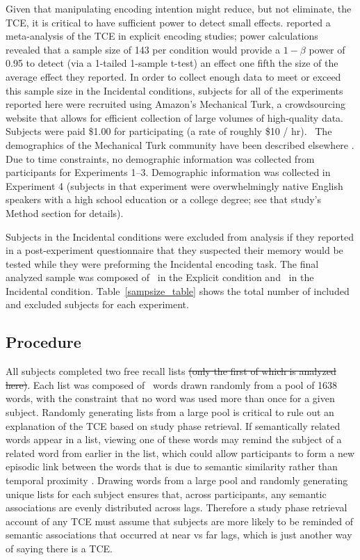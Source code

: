 \documentclass[man,natbib,floatsintext]{apa6} %
\begin{document}
Given that manipulating encoding intention might reduce, but not eliminate, the TCE, it is critical to have sufficient power to detect small effects. \citet{SedeEtal10} reported a meta-analysis of the TCE in explicit encoding studies; power calculations revealed that a sample size of 143 per condition would provide a $1-\beta$ power of 0.95 to detect (via a 1-tailed 1-sample t-test) an effect one fifth the size of the average effect they reported.
In order to collect enough data to meet or exceed this sample size in the Incidental conditions, subjects for all of the experiments reported here were recruited using Amazon's Mechanical Turk, a crowdsourcing website that allows for efficient collection of large volumes of high-quality data. Subjects were paid \$1.00 for participating (a rate of roughly \$10 / hr).~\label{TODO-10} \color{red}The demographics of the Mechanical Turk community have been described elsewhere \cite[approximately 55\% female with a mean age of 32;][]{MasoSuri12}. Due to time constraints, no demographic information was collected from participants for Experiments 1--3. Demographic information was collected in Experiment 4 (subjects in that experiment were overwhelmingly native English speakers with a high school education or a college degree; see that study's Method section for details). \color{black}

Subjects in the Incidental conditions were excluded from analysis if they reported in a post-experiment questionnaire that they suspected their memory would be tested while they were preforming the Incidental encoding task. The final analyzed sample was composed of \shoeExplicitIncluded~in the Explicit condition and \shoeIncidentalIncluded~in the Incidental condition. Table~\ref{sampsize_table} shows the total number of included and excluded subjects for each experiment.

\subsection{Procedure}
All subjects completed two free recall lists \st{(only the first of which is analyzed here)}. Each list was composed of \listlength~words drawn randomly from a pool of 1638 words, with the constraint that no word was used more than once for a given subject. \color{red} Randomly generating lists from a large pool is critical to rule out an explanation of the TCE based on study phase retrieval. If semantically related words appear in a list, viewing one of these words may remind the subject of a related word from earlier in the list, which could allow participants to form a new episodic link between the words that is due to semantic similarity rather than temporal proximity \citep{HintEtal75,HintBloc73,Hint16}. Drawing words from a large pool and randomly generating unique lists for each subject ensures that, across participants, any semantic associations are evenly distributed across lags. Therefore a study phase retrieval account of any TCE must assume that subjects are more likely to be reminded of semantic associations that occurred at near vs far lags, which is just another way of saying there is a TCE. \color{black}
\end{document}
